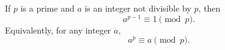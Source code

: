 If $p$ is a prime and $a$ is an integer not divisible by $p$, then
$$a^{p-1} \equiv 1 \pmod{p}.$$
Equivalently, for any integer $a$,
$$a^p \equiv a \pmod{p}.$$
